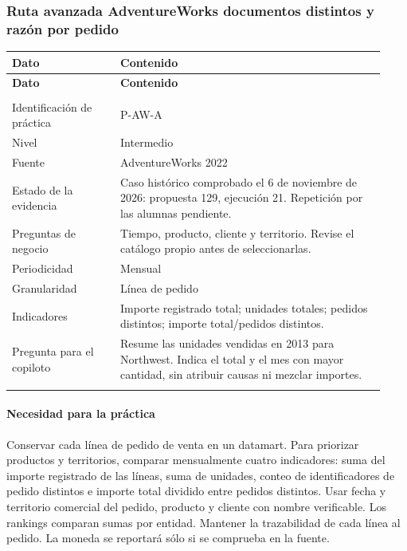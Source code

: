 \subsubsection{Ruta avanzada AdventureWorks documentos distintos y razón por pedido}
\begingroup
\fontsize{10}{12.5}\selectfont
\setlength{\tabcolsep}{5pt}
\renewcommand{\arraystretch}{1.15}
\begin{longtable}{@{}>{\RaggedRight\arraybackslash}p{0.27\linewidth}>{\RaggedRight\arraybackslash}p{0.66\linewidth}@{}}
\toprule
\textbf{Dato} & \textbf{Contenido} \\
\midrule
\endfirsthead
\toprule
\textbf{Dato} & \textbf{Contenido} \\
\midrule
\endhead
\midrule
\multicolumn{2}{r}{\footnotesize Continúa en la página siguiente}\\
\endfoot
\bottomrule
\endlastfoot
Identificación de práctica & P-AW-A \\
\addlinespace[3pt]
Nivel & Intermedio \\
\addlinespace[3pt]
Fuente & AdventureWorks 2022 \\
\addlinespace[3pt]
Estado de la evidencia & Caso histórico comprobado el 6 de noviembre de 2026: propuesta 129, ejecución 21. Repetición por las alumnas pendiente. \\
\addlinespace[3pt]
Preguntas de negocio & Tiempo, producto, cliente y territorio. Revise el catálogo propio antes de seleccionarlas. \\
\addlinespace[3pt]
Periodicidad & Mensual \\
\addlinespace[3pt]
Granularidad & Línea de pedido \\
\addlinespace[3pt]
Indicadores & Importe registrado total; unidades totales; pedidos distintos; importe total/pedidos distintos. \\
\addlinespace[3pt]
Pregunta para el copiloto & Resume las unidades vendidas en 2013 para Northwest. Indica el total y el mes con mayor cantidad, sin atribuir causas ni mezclar importes. \\
\addlinespace[3pt]
\end{longtable}
\endgroup

\paragraph{Necesidad para la práctica} Conservar cada línea de pedido de venta en un datamart. Para priorizar productos y territorios, comparar mensualmente cuatro indicadores: suma del importe registrado de las líneas, suma de unidades, conteo de identificadores de pedido distintos e importe total dividido entre pedidos distintos. Usar fecha y territorio comercial del pedido, producto y cliente con nombre verificable. Los rankings comparan sumas por entidad. Mantener la trazabilidad de cada línea al pedido. La moneda se reportará sólo si se comprueba en la fuente.

